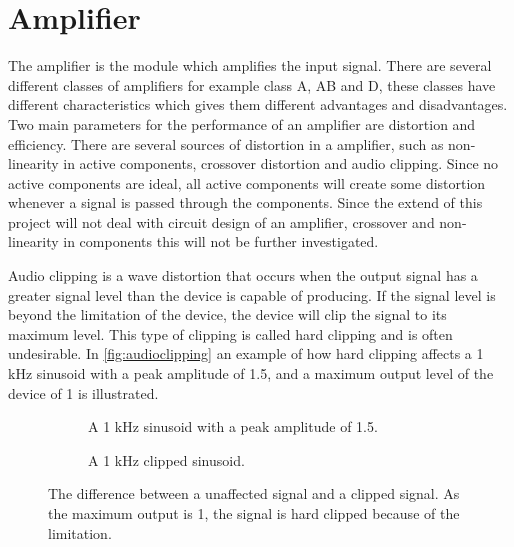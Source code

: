 \section{Amplifier}
The amplifier is the module which amplifies the input signal. There are several different classes of amplifiers for example class A, AB and D, these classes have different characteristics which gives them different advantages and disadvantages. Two main parameters for the performance of an amplifier are distortion and efficiency. There are several sources of distortion in a amplifier, such as non-linearity in active components, crossover distortion and audio clipping. Since no active components are ideal, all active components will create some distortion whenever a signal is passed through the components. Since the extend of this project will not deal with circuit design of an amplifier, crossover and non-linearity in components this will not be further investigated.

Audio clipping is a wave distortion that occurs when the output signal has a greater signal level than the device is capable of producing. If the signal level is beyond the limitation of the device, the device will clip the signal to its maximum level. This type of clipping is called hard clipping and is often undesirable. In \autoref{fig:audioclipping} an example of how hard clipping affects a 1 kHz sinusoid with a peak amplitude of 1.5, and a maximum output level of the device of 1 is illustrated.

\begin{figure}[H]
\centering
\begin{subfigure}[t]{0.47\textwidth}
	
	\caption{A 1 kHz sinusoid with a peak amplitude of 1.5.}
	\label{fig:clippingClean}
\end{subfigure}
\begin{subfigure}[t]{0.47\textwidth}
	
	\caption{A 1 kHz clipped sinusoid.}
	\label{fig:clippingDist}
\end{subfigure}
\caption{The difference between a unaffected signal and a clipped signal. As the maximum output is 1, the signal is hard clipped because of the limitation.}
\label{fig:audioclipping}
\end{figure}

